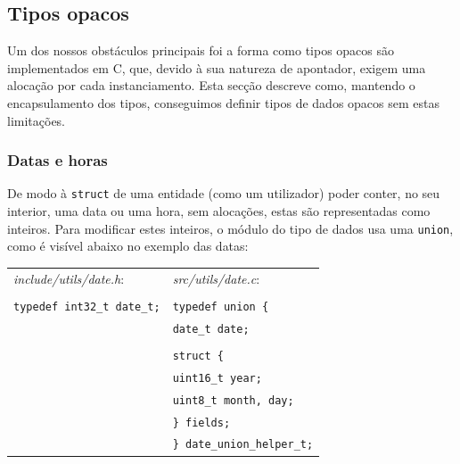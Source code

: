 \documentclass[12pt, a4paper]{article}
\begin{document}
\subsection{Tipos opacos}

Um dos nossos obstáculos principais foi a forma como tipos opacos são implementados em C, que,
devido à sua natureza de apontador, exigem uma alocação por cada instanciamento. Esta secção
descreve como, mantendo o encapsulamento dos tipos, conseguimos definir tipos de dados opacos sem
estas limitações.

\subsubsection{Datas e horas}

De modo à \texttt{struct} de uma entidade (como um utilizador) poder conter, no seu interior, uma
data ou uma hora, sem alocações, estas são representadas como inteiros. Para modificar estes
inteiros, o módulo do tipo de dados usa uma \texttt{union}, como é visível abaixo no exemplo das
datas:


\begin{spacing}{1}
\begin{center}
    \begin{tabular}{ |l|l| }
        \hline
        \emph{include/utils/date.h}: & \emph{src/utils/date.c}: \\
		& \\
		\texttt{typedef int32\_t date\_t;} & \texttt{typedef union \{} \\
										   & \texttt{\hspace{0.5cm}date\_t date;} \\
                                           & \texttt{} \\
                                           & \texttt{\hspace{0.5cm}struct \{} \\
                                           & \texttt{\hspace{1cm}uint16\_t year;} \\
                                           & \texttt{\hspace{1cm}uint8\_t month, day;} \\
                                           & \texttt{\hspace{0.5cm}\} fields;} \\
                                           & \texttt{\} date\_union\_helper\_t;} \\
        \hline
    \end{tabular}
\end{center}
\end{spacing}
\end{document}
